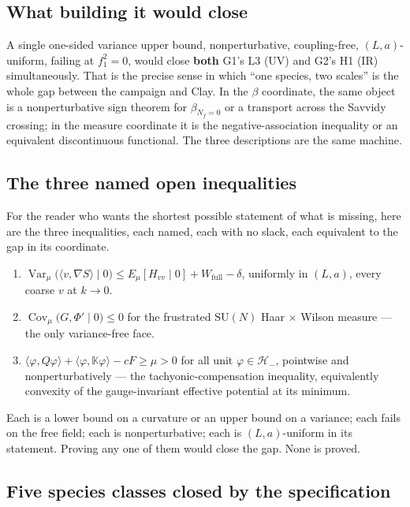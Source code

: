 \subsection{What building it would close}

A single one-sided variance upper bound, nonperturbative, coupling-free, $(L,a)$-uniform, failing
at $f_1^2=0$, would close \textbf{both} G1's L3 (UV) and G2's H1 (IR) simultaneously. That is the
precise sense in which ``one species, two scales'' is the whole gap between the campaign and
Clay. In the $\beta$ coordinate, the same object is a nonperturbative sign theorem for
$\beta_{N_f=0}$ or a transport across the Savvidy crossing; in the measure coordinate it is the
negative-association inequality or an equivalent discontinuous functional. The three descriptions
are the same machine.

\subsection{The three named open inequalities}

For the reader who wants the shortest possible statement of what is missing, here are the three
inequalities, each named, each with no slack, each equivalent to the gap in its coordinate.

\begin{enumerate}
\item[\textbf{(H1)}] $\displaystyle
  \operatorname{Var}_\mu\bigl(\langle v,\nabla S\rangle\mid0\bigr)
  \le E_\mu[H_{vv}\mid0]+W_{\mathrm{full}}-\delta$, uniformly in $(L,a)$, every coarse $v$ at
  $k\to0$.
\item[\textbf{(NA)}] $\displaystyle \operatorname{Cov}_\mu\bigl(G,\Phi'\mid0\bigr)\le0$ for the
  frustrated $\mathrm{SU}(N)$ Haar $\times$ Wilson measure --- the only variance-free face.
\item[\textbf{(TCI)}] $\displaystyle
  \langle\varphi,Q\varphi\rangle+\langle\varphi,\mathbb{K}\varphi\rangle-cF\ge\mu>0$ for all
  unit $\varphi\in\mathcal{H}_-$, pointwise and nonperturbatively --- the tachyonic-compensation
  inequality, equivalently convexity of the gauge-invariant effective potential at its minimum.
\end{enumerate}
Each is a lower bound on a curvature or an upper bound on a variance; each fails on the free
field; each is nonperturbative; each is $(L,a)$-uniform in its statement. Proving any one of them
would close the gap. None is proved.

\subsection{Five species classes closed by the specification}

